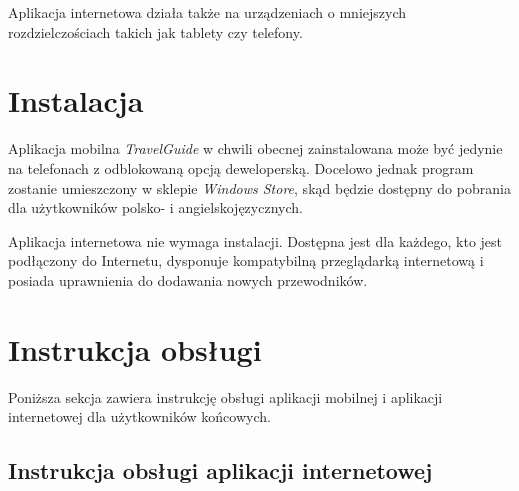 \documentclass[a4paper]{book}
\newcommand{\appName}{\emph{TravelGuide} }
\begin{document}
		Aplikacja internetowa działa także na urządzeniach o mniejszych rozdzielczościach takich jak tablety czy telefony.
		
		\section{Instalacja}
		
		Aplikacja mobilna \appName w chwili obecnej zainstalowana może być jedynie na telefonach z odblokowaną opcją deweloperską. Docelowo jednak program zostanie umieszczony w sklepie \emph{Windows Store}, skąd będzie dostępny do pobrania dla użytkowników polsko- i angielskojęzycznych. 
		
		Aplikacja internetowa nie wymaga instalacji. Dostępna jest dla każdego, kto jest podłączony do Internetu, dysponuje kompatybilną przeglądarką internetową i posiada uprawnienia do dodawania nowych przewodników. 
	
	
		\section{Instrukcja obsługi}
		
		Poniższa sekcja zawiera instrukcję obsługi aplikacji mobilnej i aplikacji internetowej dla użytkowników końcowych. 
		
		\subsection{Instrukcja obsługi aplikacji internetowej}	
		
\end{document}
